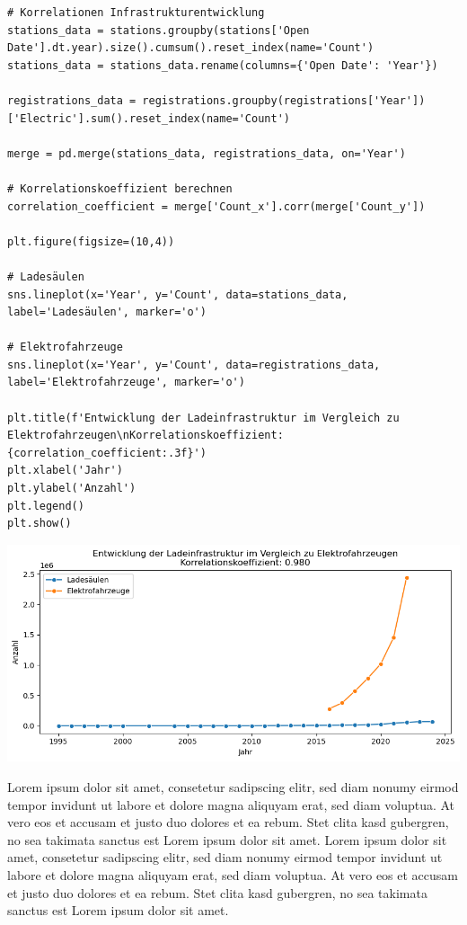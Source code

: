 \begin{verbatim}
# Korrelationen Infrastrukturentwicklung
stations_data = stations.groupby(stations['Open Date'].dt.year).size().cumsum().reset_index(name='Count')
stations_data = stations_data.rename(columns={'Open Date': 'Year'})

registrations_data = registrations.groupby(registrations['Year'])['Electric'].sum().reset_index(name='Count')

merge = pd.merge(stations_data, registrations_data, on='Year')

# Korrelationskoeffizient berechnen
correlation_coefficient = merge['Count_x'].corr(merge['Count_y'])

plt.figure(figsize=(10,4))

# Ladesäulen
sns.lineplot(x='Year', y='Count', data=stations_data, label='Ladesäulen', marker='o')

# Elektrofahrzeuge
sns.lineplot(x='Year', y='Count', data=registrations_data, label='Elektrofahrzeuge', marker='o')

plt.title(f'Entwicklung der Ladeinfrastruktur im Vergleich zu Elektrofahrzeugen\nKorrelationskoeffizient: {correlation_coefficient:.3f}')
plt.xlabel('Jahr')
plt.ylabel('Anzahl')
plt.legend()
plt.show()
\end{verbatim}

\begin{center}
\includegraphics[scale=0.5]{img/output_6_0.png}
\end{center}

Lorem ipsum dolor sit amet, consetetur sadipscing elitr, sed diam nonumy eirmod tempor invidunt ut labore et dolore magna aliquyam erat, sed diam voluptua. At vero eos et accusam et justo duo dolores et ea rebum. Stet clita kasd gubergren, no sea takimata sanctus est Lorem ipsum dolor sit amet. Lorem ipsum dolor sit amet, consetetur sadipscing elitr, sed diam nonumy eirmod tempor invidunt ut labore et dolore magna aliquyam erat, sed diam voluptua. At vero eos et accusam et justo duo dolores et ea rebum. Stet clita kasd gubergren, no sea takimata sanctus est Lorem ipsum dolor sit amet.

